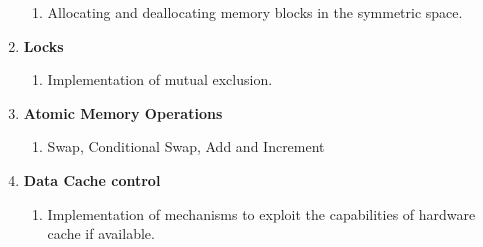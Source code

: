 \begin{enumerate}
\begin{enumerate}
\item Allocating and deallocating memory blocks in the symmetric space.
\end{enumerate}
\item \textbf{Locks}

\begin{enumerate}
\item Implementation of mutual exclusion.
\end{enumerate}
\item \textbf{Atomic Memory Operations}

\begin{enumerate}
\item Swap, Conditional Swap, Add and Increment 
\end{enumerate}
\item \textbf{Data Cache control}

\begin{enumerate}
\item Implementation of mechanisms to exploit the capabilities of hardware
cache if available.
\end{enumerate}
\end{enumerate}
